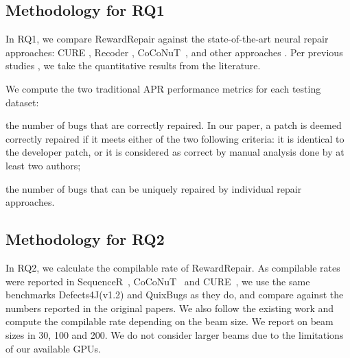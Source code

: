 \subsection{Methodology for RQ1}
\label{sec:method_rq1}
In RQ1, we compare 
RewardRepair against the state-of-the-art neural repair approaches: CURE \cite{CURE-icse21}, Recoder \cite{Recoder}, CoCoNuT~\cite{CoCoNuT}, and other approaches \cite{hercules,tbar,Simfix:2018,capgen-ICSE18,Yuan2017ARJAAR,sharpFix,elixir,nopol,astor}.
Per  previous studies \cite{CoCoNuT,CURE-icse21}, we take the quantitative results from the literature.

We compute the two traditional APR performance metrics for each testing dataset:
\begin{inparaenum}[\it 1)]
\item  the number of bugs that are correctly repaired. In our paper, a patch is deemed correctly repaired if it meets either of the two following criteria:  it is identical to the developer patch, or it is considered as correct by manual analysis done by at least two authors;
\item the number of bugs that can be uniquely repaired by individual repair approaches.
\end{inparaenum}

\subsection{Methodology for RQ2}
In RQ2, we calculate the compilable rate of RewardRepair.
As compilable rates were reported in SequenceR~\cite{SEQUENCER}, CoCoNuT~\cite{CoCoNuT} and CURE~\cite{CURE-icse21}, we use the same benchmarks Defects4J(v1.2) and QuixBugs as they do, and compare against the numbers reported in the original papers. 
We also follow the existing work \cite{CURE-icse21} and compute the compilable rate depending on the beam size.
We report on beam sizes in 30, 100 and 200.
We do not consider larger beams due to the limitations of our available GPUs. 

